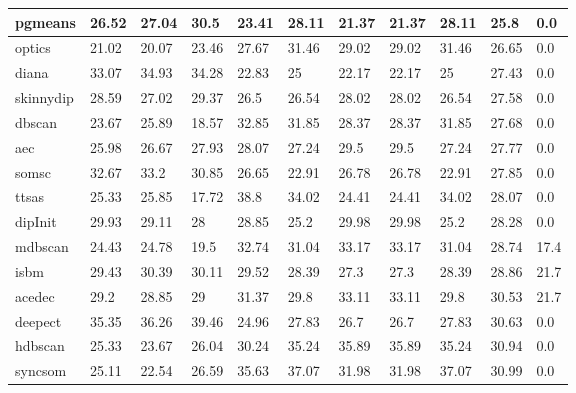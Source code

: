 \begin{table}[H]
\begin{tabular}{|l|l|l|l|l|l|l|l|l|l|l|}
\\\hline
pgmeans & 26.52 & 27.04 & 30.5 & 23.41 & 28.11 & 21.37 & 21.37 & 28.11 & 25.8 & 0.0%
\\\hline
optics & 21.02 & 20.07 & 23.46 & 27.67 & 31.46 & 29.02 & 29.02 & 31.46 & 26.65 & 0.0%
\\\hline
diana & 33.07 & 34.93 & 34.28 & 22.83 & 25 & 22.17 & 22.17 & 25 & 27.43 & 0.0%
\\\hline
skinnydip & 28.59 & 27.02 & 29.37 & 26.5 & 26.54 & 28.02 & 28.02 & 26.54 & 27.58 & 0.0%
\\\hline
dbscan & 23.67 & 25.89 & 18.57 & 32.85 & 31.85 & 28.37 & 28.37 & 31.85 & 27.68 & 0.0%
\\\hline
aec & 25.98 & 26.67 & 27.93 & 28.07 & 27.24 & 29.5 & 29.5 & 27.24 & 27.77 & 0.0%
\\\hline
somsc & 32.67 & 33.2 & 30.85 & 26.65 & 22.91 & 26.78 & 26.78 & 22.91 & 27.85 & 0.0%
\\\hline
ttsas & 25.33 & 25.85 & 17.72 & 38.8 & 34.02 & 24.41 & 24.41 & 34.02 & 28.07 & 0.0%
\\\hline
dipInit & 29.93 & 29.11 & 28 & 28.85 & 25.2 & 29.98 & 29.98 & 25.2 & 28.28 & 0.0%
\\\hline
mdbscan & 24.43 & 24.78 & 19.5 & 32.74 & 31.04 & 33.17 & 33.17 & 31.04 & 28.74 & 17.4%
\\\hline
isbm & 29.43 & 30.39 & 30.11 & 29.52 & 28.39 & 27.3 & 27.3 & 28.39 & 28.86 & 21.7%
\\\hline
acedec & 29.2 & 28.85 & 29 & 31.37 & 29.8 & 33.11 & 33.11 & 29.8 & 30.53 & 21.7%
\\\hline
deepect & 35.35 & 36.26 & 39.46 & 24.96 & 27.83 & 26.7 & 26.7 & 27.83 & 30.63 & 0.0%
\\\hline
hdbscan & 25.33 & 23.67 & 26.04 & 30.24 & 35.24 & 35.89 & 35.89 & 35.24 & 30.94 & 0.0%
\\\hline
syncsom & 25.11 & 22.54 & 26.59 & 35.63 & 37.07 & 31.98 & 31.98 & 37.07 & 30.99 & 0.0%

\end{tabular}
\end{table}
